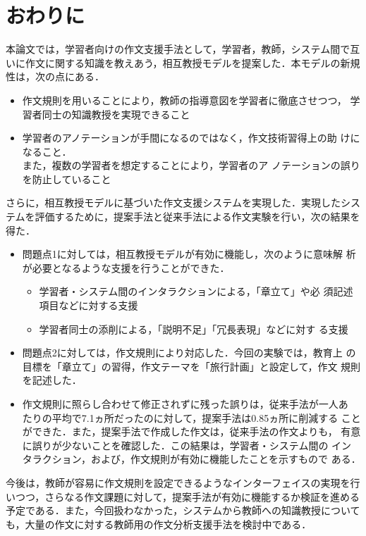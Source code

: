 \documentclass[japanese]{jnlp_1.4}
\def\mod{}
\begin{document}
{\mod
\section{おわりに}\label{sec:conclusion}

本論文では，学習者向けの作文支援手法として，学習者，教師，システム間で互
いに作文に関する知識を教えあう，相互教授モデルを提案した．本モデルの新規
性は，次の点にある．

\begin{itemize}
 \item 作文規則を用いることにより，教師の指導意図を学習者に徹底させつつ，
       学習者同士の知識教授を実現できること
 \item 学習者のアノテーションが手間になるのではなく，作文技術習得上の助
       けになること．\\
	また，複数の学習者を想定することにより，学習者のア
       ノテーションの誤りを防止していること
\end{itemize}

さらに，相互教授モデルに基づいた作文支援システムを実現した．実現したシス
テムを評価するために，提案手法と従来手法による作文実験を行い，次の結果を
得た．

\begin{itemize}
 \item 問題点1に対しては，相互教授モデルが有効に機能し，次のように意味解
       析が必要となるような支援を行うことができた．
       \begin{itemize}
	\item 学習者・システム間のインタラクションによる，「章立て」や必
	      須記述項目などに対する支援
	\item 学習者同士の添削による，「説明不足」「冗長表現」などに対す
	      る支援
       \end{itemize}
 \item 問題点2に対しては，作文規則により対応した．今回の実験では，教育上
       の目標を「章立て」の習得，作文テーマを「旅行計画」と設定して，作文
       規則を記述した．
 \item 作文規則に照らし合わせて修正されずに残った誤りは，従来手法が一人あ
       たりの平均で7.1ヵ所だったのに対して，提案手法は0.85ヵ所に削減する
       ことができた．また，提案手法で作成した作文は，従来手法の作文よりも，
       有意に誤りが少ないことを確認した．この結果は，学習者・システム間の
       インタラクション，および，作文規則が有効に機能したことを示すもので
       ある．
\end{itemize}

今後は，教師が容易に作文規則を設定できるようなインターフェイスの実現を行
いつつ，さらなる作文課題に対して，提案手法が有効に機能するか検証を進める
予定である．また，今回扱わなかった，システムから教師への知識教授について
も，大量の作文に対する教師用の作文分析支援手法を検討中である．
}
\end{document}
